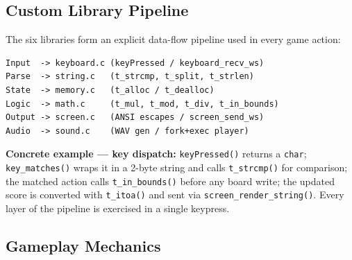\documentclass[conference]{IEEEtran}
\begin{document}
\subsection{Custom Library Pipeline}

The six libraries form an explicit data-flow pipeline used in every game action:

\begin{lstlisting}[caption={Data Flow Pipeline}]
Input  -> keyboard.c (keyPressed / keyboard_recv_ws)
Parse  -> string.c   (t_strcmp, t_split, t_strlen)
State  -> memory.c   (t_alloc / t_dealloc)
Logic  -> math.c     (t_mul, t_mod, t_div, t_in_bounds)
Output -> screen.c   (ANSI escapes / screen_send_ws)
Audio  -> sound.c    (WAV gen / fork+exec player)
\end{lstlisting}

\textbf{Concrete example --- key dispatch:} \texttt{keyPressed()} returns a \texttt{char}; \texttt{key\_matches()} wraps it in a 2-byte string and calls \texttt{t\_strcmp()} for comparison; the matched action calls \texttt{t\_in\_bounds()} before any board write; the updated score is converted with \texttt{t\_itoa()} and sent via \texttt{screen\_render\_string()}. Every layer of the pipeline is exercised in a single keypress.

\subsection{Gameplay Mechanics}
\end{document}
